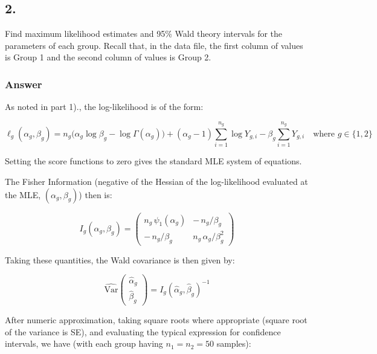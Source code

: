 \documentclass[
]{article}
\begin{document}
\subsection{2.}\label{section-1}

Find maximum likelihood estimates and 95\% Wald theory intervals for the
parameters of each group. Recall that, in the data file, the first
column of values is Group 1 and the second column of values is Group 2.

\subsubsection{Answer}\label{answer-1}

As noted in part 1)., the log-likelihood is of the form:

\[
\ell_g(\alpha_g,\beta_g)
= n_g\big(\alpha_g\log\beta_g-\log\Gamma(\alpha_g)\big)
 +(\alpha_g-1)\sum_{i=1}^{n_g}\log Y_{g,i}
 -\beta_g\sum_{i=1}^{n_g}Y_{g,i} \quad \text{where } g \in \{1, 2\}
\]

Setting the score functions to zero gives the standard MLE system of
equations.

The Fisher Information (negative of the Hessian of the log-likelihood
evaluated at the MLE, \((\alpha_g,\beta_g)\)) then is:

\[
I_g(\alpha_g,\beta_g)=
\begin{pmatrix}
n_g\,\psi_{1}(\alpha_g) & -\,n_g/\beta_g\\[4pt]
-\,n_g/\beta_g & n_g\,\alpha_g/\beta_g^2
\end{pmatrix}
\]

Taking these quantities, the Wald covariance is then given by:

\[
\widehat{\mathrm{Var}}\!\begin{pmatrix}\hat\alpha_g\\ \hat\beta_g\end{pmatrix}
= I_g(\hat\alpha_g,\hat\beta_g)^{-1}
\]

After numeric approximation, taking square roots where appropriate
(square root of the variance is SE), and evaluating the typical
expression for confidence intervals, we have (with each group having
\(n_1=n_2=50\) samples):
\end{document}
